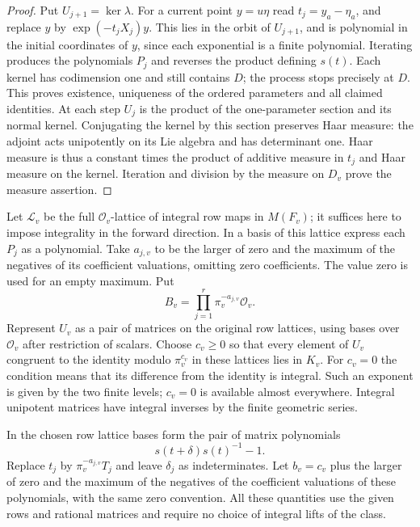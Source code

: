 \documentclass[a4paper,11pt]{article}
\theoremstyle{definition}
\theoremstyle{remark}
\numberwithin{equation}{section}
\begin{document}
\begin{proof}
Put \(U_{j+1}=\ker\lambda\). For a current point \(y=u\eta\)
read \(t_j=y_a-\eta_a\), and replace \(y\) by
\(\exp(-t_jX_j)y\). This lies in the orbit of \(U_{j+1}\),
and is polynomial in the initial coordinates of \(y\), since
each exponential is a finite polynomial. Iterating produces
the polynomials \(P_j\) and reverses the product defining
\(s(t)\). Each kernel has codimension one and still contains
\(D\); the process stops precisely at \(D\). This proves
existence, uniqueness of the ordered parameters and all
claimed identities. At each step \(U_j\) is the product of
the one-parameter section and its normal kernel. Conjugating
the kernel by this section preserves Haar measure: the
adjoint acts unipotently on its Lie algebra and has determinant
one. Haar measure is thus a constant times the product of
additive measure in \(t_j\) and Haar measure on the kernel.
Iteration and division by the measure on \(D_v\) prove the
measure assertion.
\end{proof}

Let \(\mathcal L_v\) be the full \(\mathcal O_v\)-lattice of
integral row maps in \(M(F_v)\); it suffices here to impose
integrality in the forward direction. In a basis of this
lattice express each \(P_j\) as a polynomial. Take \(a_{j,v}\)
to be the larger of zero and the maximum of the negatives
of its coefficient valuations, omitting zero coefficients.
The value zero is used for an empty maximum. Put
\[
                     B_v=\prod_{j=1}^r\pi_v^{-a_{j,v}}\mathcal O_v .
\]
Represent \(U_v\) as a pair of matrices on the original row
lattices, using bases over \(\mathcal O_v\) after restriction
of scalars. Choose \(c_v\ge0\) so that every element of \(U_v\)
congruent to the identity modulo \(\pi_v^{c_v}\) in these
lattices lies in \(K_v\). For \(c_v=0\) the condition means
that its difference from the identity is integral. Such an
exponent is given by the two finite levels; \(c_v=0\) is
available almost everywhere. Integral unipotent matrices have
integral inverses by the finite geometric series.

In the chosen row lattice bases form the pair of matrix
polynomials
\[
              s(t+\delta)s(t)^{-1}-1 .
\]
Replace \(t_j\) by \(\pi_v^{-a_{j,v}}T_j\) and leave
\(\delta_j\) as indeterminates. Let \(b_v=c_v\) plus the
larger of zero and the maximum of the negatives of the
coefficient valuations of these polynomials, with the same
zero convention. All these quantities use the given rows
and rational matrices and require no choice of integral
lifts of the class.
\end{document}
